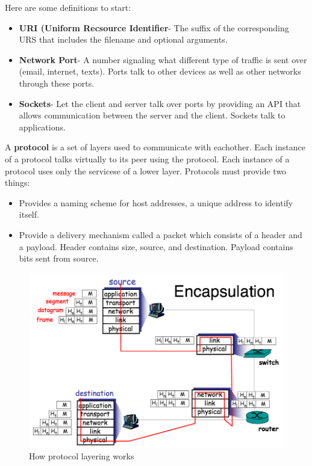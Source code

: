 



Here are some definitions to start:
\begin{itemize}
\item {\bf URI (Uniform Recsource Identifier}- The suffix of the corresponding URS that includes the filename and optional arguments.
\item {\bf Network Port}- A number signaling what different type of traffic is sent over (email, internet, texts).  Ports talk to other devices as well as other networks through these ports.  
\item {\bf Sockets}- Let the client and server talk over ports by providing an API that allows communication between the server and the client.  Sockets talk to applications.
\end{itemize}

A {\bf  protocol } is a set of layers used to communicate with eachother.  Each instance of a protocol talks virtually to its peer using the protocol.  Each instance of a protocol uses only the servicese of a lower layer.  Protocols must provide two things:
\begin{itemize}
\item Provides a naming scheme for host addresses, a unique address to identify itself.
\item Provide a delivery mechanism called a packet which consists of a header and a payload.  Header contains size, source, and destination.  Payload contains bits sent from source.
\end{itemize}


\begin{figure}[H] %
\begin{center}
\includegraphics[width=.8\linewidth]{encapsulation}
\end{center}
\caption{How protocol layering works}
\label{fig:example_figure}
\end{figure}
